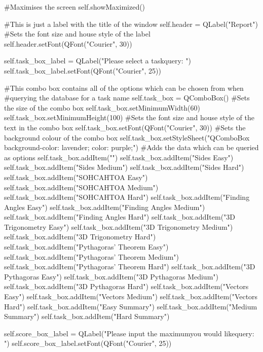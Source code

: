 \begin{landscape}
\begin{python}
        #Maximises the screen
        self.showMaximized()

        #This is just a label with the title of the window
        self.header = QLabel("Report")
        #Sets the font size and house style of the label
        self.header.setFont(QFont("Courier", 30))

        self.task_box_label = QLabel("Please select a task\nto query: ")
        self.task_box_label.setFont(QFont("Courier", 25))

        #This combo box contains all of the options which can be chosen from when
        #querying the database for a task name
        self.task_box = QComboBox()
        #Sets the size of the combo box
        self.task_box.setMinimumWidth(60)
        self.task_box.setMinimumHeight(100)
        #Sets the font size and house style of the text in the combo box
        self.task_box.setFont(QFont("Courier", 30))
        #Sets the background colour of the combo box
        self.task_box.setStyleSheet("QComboBox {background-color: lavender; color: purple;}")
        #Adds the data which can be queried as options
        self.task_box.addItem("")
        self.task_box.addItem("Sides Easy")
        self.task_box.addItem("Sides Medium")
        self.task_box.addItem("Sides Hard")
        self.task_box.addItem("SOHCAHTOA Easy")
        self.task_box.addItem("SOHCAHTOA Medium")
        self.task_box.addItem("SOHCAHTOA Hard")
        self.task_box.addItem("Finding Angles Easy")
        self.task_box.addItem("Finding Angles Medium")
        self.task_box.addItem("Finding Angles Hard")
        self.task_box.addItem("3D Trigonometry Easy")
        self.task_box.addItem("3D Trigonometry Medium")
        self.task_box.addItem("3D Trigonometry Hard")
        self.task_box.addItem("Pythagoras' Theorem Easy")
        self.task_box.addItem("Pythagoras' Theorem Medium")
        self.task_box.addItem("Pythagoras' Theorem Hard")
        self.task_box.addItem("3D Pythagoras Easy")
        self.task_box.addItem("3D Pythagoras Medium")
        self.task_box.addItem("3D Pythagoras Hard")
        self.task_box.addItem("Vectors Easy")
        self.task_box.addItem("Vectors Medium")
        self.task_box.addItem("Vectors Hard")
        self.task_box.addItem("Easy Summary")
        self.task_box.addItem("Medium Summary")
        self.task_box.addItem("Hard Summary")
        
        self.score_box_label = QLabel("Please input the maximum\nscore you would like\nto query: ")
        self.score_box_label.setFont(QFont("Courier", 25))


\end{python}
\end{landscape}
